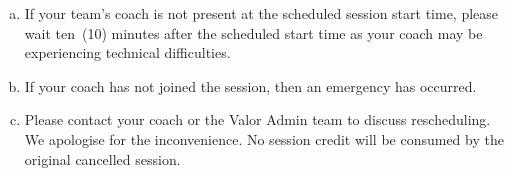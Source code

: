 \documentclass[10pt]{article}
\begin{document}
\begin{enumerate}[(a)]
\item
If your team's coach is not present at the scheduled session start time, please wait ten~(10) minutes after the scheduled start time as your coach may be experiencing technical difficulties.

\item
If your coach has not joined the session, then an emergency has occurred.

\item
Please contact your coach or the Valor Admin team to discuss rescheduling. We apologise for the inconvenience. No session credit will be consumed by the original cancelled session.
\end{enumerate}
\end{document}
